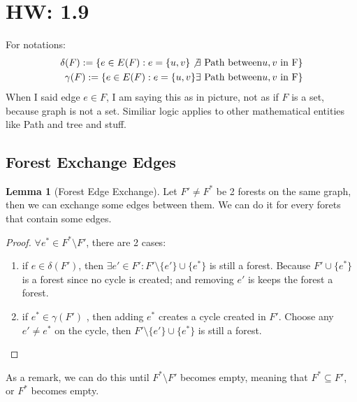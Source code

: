 \documentclass[]{article}
\theoremstyle{definition}
\newtheorem{lemma}{Lemma}
\begin{document}
\section{HW: 1.9}
    For notations: 
    \begin{align}
        \delta(F):= \{
            e\in E(F): e = \{u, v\} \not\exists \text{ Path between} u, v \text{ in F}
        \}
        \\
        \gamma(F):= \{
            e\in E(F): e = \{u, v\} \exists \text{ Path between} u, v \text{ in F}
        \}
    \end{align}
    When I said edge $e\in F$, I am saying this as in picture, not as if $F$ is a set, because graph is not a set. Similiar logic applies to other mathematical entities like Path and tree and stuff. 
    \subsection{Forest Exchange Edges}
        \begin{lemma}[Forest Edge Exchange]
            Let $F' \neq F^*$ be 2 forests on the same graph, then we can exchange some edges between them. We can do it for every forets that contain some edges.     
        \end{lemma}
        \begin{proof}
            $\forall e^* \in F^*\setminus F'$, there are 2 cases: 
            \begin{enumerate}
                \item [1.] if $e\in \delta(F')$, then $\exists e'\in F': F'\setminus \{e'\}\cup \{e^*\}$ is still a forest. Because $F'\cup \{e^*\}$ is a forest since no cycle is created; and removing $e'$ is keeps the forest a forest.
                \item [2.] if $e^*\in \gamma (F')$ , then adding $e^*$ creates a cycle created in $F'$. Choose any $e'\neq e^*$ on the cycle, then $F'\setminus \{e'\}\cup \{e^*\}$ is still a forest. 
            \end{enumerate}
        \end{proof}
        As a remark, we can do this until $F^*\setminus F'$ becomes empty, meaning that $F^*\subseteq F'$, or $F^*$ becomes empty. 
\end{document}
